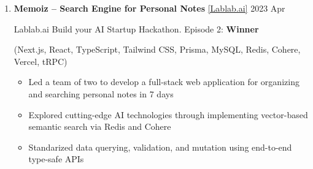 \documentclass[
  a4paper,
  10pt,
  dvipdfmx
]{article}
\begin{document}
\begin{enumerate}[]




  \item \textbf{Memoiz -- Search Engine for Personal Notes} \href{https://lablab.ai/event/ai-startup-hackathon-episode-2/we-absolutely-have-no-idea/memoiz}{[Lablab.ai]} \hfill 2023 Apr

        Lablab.ai Build your AI Startup Hackathon. Episode 2: \textbf{Winner}

        (Next.js, React, TypeScript, Tailwind CSS, Prisma, MySQL, Redis, Cohere, Vercel, tRPC)

        \begin{itemize}
          \item Led a team of two to develop a full-stack web application for organizing and searching personal notes in 7 days
          \item Explored cutting-edge AI technologies through implementing vector-based semantic search via Redis and Cohere
          \item Standarized data querying, validation, and mutation using end-to-end type-safe APIs
        \end{itemize}


\end{enumerate}
\end{document}
